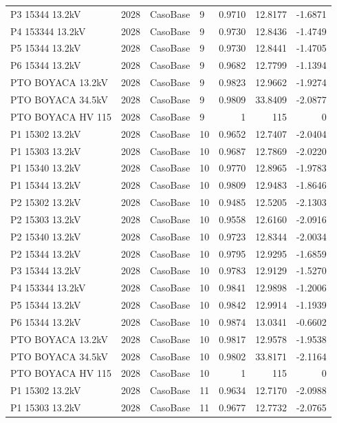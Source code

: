\documentclass[11pt,a4paper]{article}
\begin{document}
\begin{longtable}{llllrrr}
P3 15344 13.2kV & 2028 & CasoBase & 9 & 0.9710 & 12.8177 & -1.6871 \\
P4 153344 13.2kV & 2028 & CasoBase & 9 & 0.9730 & 12.8436 & -1.4749 \\
P5 15344 13.2kV & 2028 & CasoBase & 9 & 0.9730 & 12.8441 & -1.4705 \\
P6 15344 13.2kV & 2028 & CasoBase & 9 & 0.9682 & 12.7799 & -1.1394 \\
PTO BOYACA 13.2kV & 2028 & CasoBase & 9 & 0.9823 & 12.9662 & -1.9274 \\
PTO BOYACA 34.5kV & 2028 & CasoBase & 9 & 0.9809 & 33.8409 & -2.0877 \\
PTO BOYACA HV 115 & 2028 & CasoBase & 9 & 1 & 115 & 0 \\
P1 15302 13.2kV & 2028 & CasoBase & 10 & 0.9652 & 12.7407 & -2.0404 \\
P1 15303 13.2kV & 2028 & CasoBase & 10 & 0.9687 & 12.7869 & -2.0220 \\
P1 15340 13.2kV & 2028 & CasoBase & 10 & 0.9770 & 12.8965 & -1.9783 \\
P1 15344 13.2kV & 2028 & CasoBase & 10 & 0.9809 & 12.9483 & -1.8646 \\
P2 15302 13.2kV & 2028 & CasoBase & 10 & 0.9485 & 12.5205 & -2.1303 \\
P2 15303 13.2kV & 2028 & CasoBase & 10 & 0.9558 & 12.6160 & -2.0916 \\
P2 15340 13.2kV & 2028 & CasoBase & 10 & 0.9723 & 12.8344 & -2.0034 \\
P2 15344 13.2kV & 2028 & CasoBase & 10 & 0.9795 & 12.9295 & -1.6859 \\
P3 15344 13.2kV & 2028 & CasoBase & 10 & 0.9783 & 12.9129 & -1.5270 \\
P4 153344 13.2kV & 2028 & CasoBase & 10 & 0.9841 & 12.9898 & -1.2006 \\
P5 15344 13.2kV & 2028 & CasoBase & 10 & 0.9842 & 12.9914 & -1.1939 \\
P6 15344 13.2kV & 2028 & CasoBase & 10 & 0.9874 & 13.0341 & -0.6602 \\
PTO BOYACA 13.2kV & 2028 & CasoBase & 10 & 0.9817 & 12.9578 & -1.9538 \\
PTO BOYACA 34.5kV & 2028 & CasoBase & 10 & 0.9802 & 33.8171 & -2.1164 \\
PTO BOYACA HV 115 & 2028 & CasoBase & 10 & 1 & 115 & 0 \\
P1 15302 13.2kV & 2028 & CasoBase & 11 & 0.9634 & 12.7170 & -2.0988 \\
P1 15303 13.2kV & 2028 & CasoBase & 11 & 0.9677 & 12.7732 & -2.0765 \\

\end{longtable}
\end{document}

